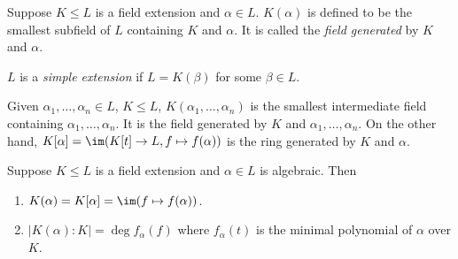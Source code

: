 \documentclass[a4paper]{article}
\begin{document}
\begin{definition}
  Suppose \(K \leq L\) is a field extension and \(\alpha \in L\). \(K(\alpha)\) is defined to be the smallest subfield of \(L\) containing \(K\) and \(\alpha\). It is called the \emph{field generated} by \(K\) and \(\alpha\).
\end{definition}

\begin{definition}
  \(L\) is a \emph{simple extension} if \(L = K(\beta)\) for some \(\beta \in L\).
\end{definition}

Given \(\alpha_1, \dots, \alpha_n \in L\), \(K \leq L\), \(K(\alpha_1, \dots, \alpha_n)\) is the smallest intermediate field containing \(\alpha_1, \dots, \alpha_n\). It is the field generated by \(K\) and \(\alpha_1, \dots, \alpha_n\). On the other hand, \(K[\alpha] = \im (K[t] \to L, f \mapsto f(\alpha))\) is the ring generated by \(K\) and \(\alpha\).

\begin{theorem}
  Suppose \(K \leq L\) is a field extension and \(\alpha \in L\) is algebraic. Then
  \begin{enumerate}
  \item \(K(\alpha) = K[\alpha] = \im (f \mapsto f(\alpha))\).
  \item \(|K(\alpha):K| = \deg f_\alpha(f)\) where \(f_\alpha(t)\) is the minimal polynomial of \(\alpha\) over \(K\).
  \end{enumerate}
\end{theorem}
\end{document}
